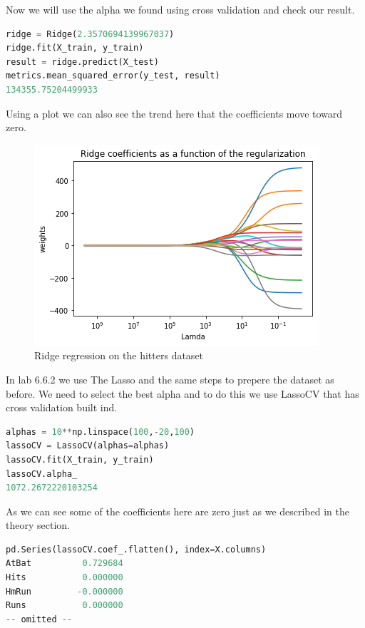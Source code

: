 Now we will use the alpha we found using  cross validation and check our result.
\begin{lstlisting}[language=Python]
ridge = Ridge(2.3570694139967037)
ridge.fit(X_train, y_train)
result = ridge.predict(X_test)
metrics.mean_squared_error(y_test, result)
134355.75204499933
\end{lstlisting}
Using a plot we can also see the trend here that the coefficients move toward zero.
\begin{figure}[H]
	\centering
	\includegraphics[width=0.5\linewidth]{shrinkageMethods/fig/plot}
	\caption{Ridge regression on the hitters dataset}
	\label{fig:plot}
\end{figure}
In lab 6.6.2 we use The Lasso and the same steps to prepere the dataset as before. We need to select the best alpha and to do this we use LassoCV that has cross validation built ind.
\begin{lstlisting}[language=Python]
alphas = 10**np.linspace(100,-20,100)
lassoCV = LassoCV(alphas=alphas)
lassoCV.fit(X_train, y_train)
lassoCV.alpha_
1072.2672220103254
\end{lstlisting}
As we can see some of the coefficients here are zero just as we described in the theory section.
\begin{lstlisting}[language=Python]
pd.Series(lassoCV.coef_.flatten(), index=X.columns)
AtBat          0.729684
Hits           0.000000
HmRun         -0.000000
Runs           0.000000
-- omitted --
\end{lstlisting}